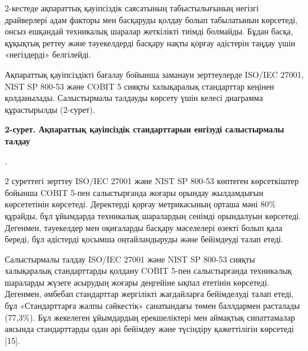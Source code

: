 
2-кестеде ақпараттық қауіпсіздік саясатының табыстылығының негізгі
драйверлері адам факторы мен басқаруды қолдау болып табылатынын
көрсетеді, онсыз ешқандай техникалық шаралар жеткілікті тиімді болмайды.
Бұдан басқа, құқықтық реттеу және тәуекелдерді басқару нақты қорғау
әдістерін таңдау үшін «негіздерді» белгілейді.

Ақпараттық қауіпсіздікті бағалау бойынша заманауи зерттеулерде ISO/IEC
27001, NIST SP 800-53 және COBIT 5 сияқты халықаралық стандарттар
кеңінен қолданылады. Салыстырмалы талдауды көрсету үшін келесі диаграмма
құрастырылды (2-сурет).

{\bfseries 2-сурет. Ақпараттық қауіпсіздік стандарттарын енгізуді
салыстырмалы талдау}

.

2 суреттегі зерттеу ISO/IEC 27001 және NIST SP 800-53 көптеген
көрсеткіштер бойынша COBIT 5-пен салыстырғанда жоғары орындау
жылдамдығын көрсететінін көрсетеді. Деректерді қорғау метрикасының
орташа мәні 80\% құрайды, бұл ұйымдарда техникалық шаралардың сенімді
орындалуын көрсетеді. Дегенмен, тәуекелдер мен оқиғаларды басқару
мәселелері өзекті болып қала береді, бұл әдістерді қосымша
оңтайландыруды және бейімдеуді талап етеді.

Салыстырмалы талдау ISO/IEC 27001 және NIST SP 800-53 сияқты халықаралық
стандарттарды қолдану COBIT 5-пен салыстырғанда техникалық шараларды
жүзеге асырудың жоғары деңгейіне ықпал ететінін көрсетеді. Дегенмен,
әмбебап стандарттар жергілікті жағдайларға бейімделуді талап етеді, бұл
«Стандарттарға жалпы сәйкестік» санатындағы төмен баллдармен расталады
(77,3\%). Бұл жекелеген ұйымдардың ерекшеліктері мен аймақтық
сипаттамалар аясында стандарттарды одан әрі бейімдеу және түсіндіру
қажеттілігін көрсетеді {[}15{]}.

